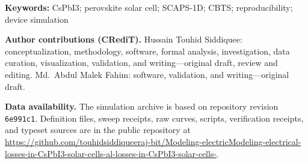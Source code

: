 \documentclass[11pt,a4paper]{article}
\begin{document}
\vspace{1em}
\noindent\textbf{Keywords:} CsPbI3; perovskite solar cell; SCAPS-1D; CBTS; reproducibility; device simulation

\vspace{1em}
\noindent\textbf{Author contributions (CRediT).} Hussain Touhid Siddiquee: conceptualization, methodology, software, formal analysis, investigation, data curation, visualization, validation, and writing---original draft, review and editing. Md.\ Abdul Malek Fahim: software, validation, and writing---original draft.

\vspace{1em}
\noindent\textbf{Data availability.} The simulation archive is based on repository revision \texttt{6e991c1}. Definition files, sweep receipts, raw curves, scripts, verification receipts, and typeset sources are in the public repository at \url{https://github.com/touhidsiddiqueeraj-bit/Modeling-electricModeling-electrical-losses-in-CsPbI3-solar-cells-al-losses-in-CsPbI3-solar-cells-}.
\end{document}
